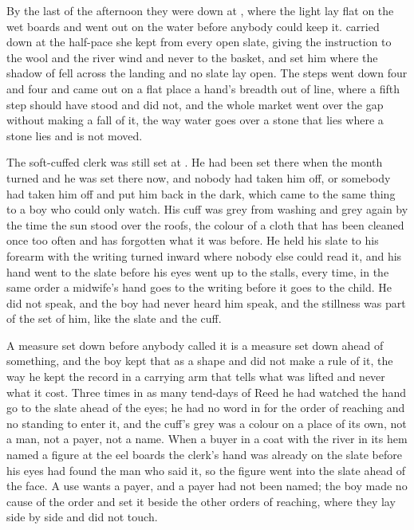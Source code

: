 By the last of the afternoon they were down at , where the light lay flat on the wet boards and went out on the water before anybody could keep it.  carried  down at the half-pace she kept from every open slate, giving the instruction to the wool and the river wind and never to the basket, and set him where the shadow of  fell across the landing and no slate lay open. The steps went down four and four and came out on a flat place a hand's breadth out of line, where a fifth step should have stood and did not, and the whole market went over the gap without making a fall of it, the way water goes over a stone that lies where a stone lies and is not moved.

The soft-cuffed clerk was still set at . He had been set there when the month turned and he was set there now, and nobody had taken him off, or somebody had taken him off and put him back in the dark, which came to the same thing to a boy who could only watch. His cuff was grey from washing and grey again by the time the sun stood over the roofs, the colour of a cloth that has been cleaned once too often and has forgotten what it was before. He held his slate to his forearm with the writing turned inward where nobody else could read it, and his hand went to the slate before his eyes went up to the stalls, every time, in the same order a midwife's hand goes to the writing before it goes to the child. He did not speak, and the boy had never heard him speak, and the stillness was part of the set of him, like the slate and the cuff.

A measure set down before anybody called it is a measure set down ahead of something, and the boy kept that as a shape and did not make a rule of it, the way he kept the record in a carrying arm that tells what was lifted and never what it cost. Three times in as many tend-days of Reed he had watched the hand go to the slate ahead of the eyes; he had no word in  for the order of reaching and no standing to enter it, and the cuff's grey was a colour on a place of its own, not a man, not a payer, not a name. When a buyer in a coat with the river in its hem named a figure at the eel boards the clerk's hand was already on the slate before his eyes had found the man who said it, so the figure went into the slate ahead of the face. A use wants a payer, and a payer had not been named; the boy made no cause of the order and set it beside the other orders of reaching, where they lay side by side and did not touch.

